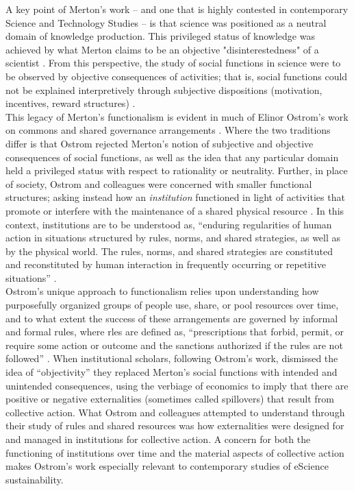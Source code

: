 \documentclass[thesis,tocnosub,noragright,centerchapter,12pt]{uiucecethesis09}
\begin{document}
A key point of
Merton's work -- and one that is highly contested in contemporary
Science and Technology Studies -- is that science was positioned as a
neutral domain of knowledge production. This privileged status of knowledge was achieved by what Merton claims to be an objective "disinterestedness" of a scientist \citeyear{merton1973sociology}. From this perspective, the study of social functions in science were to be observed by objective
consequences of activities; that is,  social functions could not be explained
interpretively through subjective dispositions (motivation, incentives,
reward structures) \citeyearpar[Ch. 13]{merton1973sociology}.\\

This legacy of Merton's functionalism is evident in much of Elinor
Ostrom's work on commons and shared governance arrangements \citeyear{ostrom1990governing}. Where the two traditions differ is that Ostrom
rejected Merton's notion of subjective and objective consequences of
social functions, as well as the idea that any particular
domain held a privileged status with respect
to rationality or neutrality. Further, in place of society, Ostrom and
colleagues were concerned with smaller functional structures; asking
instead how an \emph{institution} functioned in light of activities that
promote or interfere with the maintenance of a shared physical resource  \citep{aligica2009challenging}. In this context,
institutions are to be understood as, ``enduring regularities of human
action in situations structured by rules, norms, and shared strategies,
as well as by the physical world. The rules, norms, and shared
strategies are constituted and reconstituted by human interaction in
frequently occurring or repetitive situations'' \citep[p. 582]{crawford1995grammar}. \\

Ostrom's unique approach to functionalism relies upon
understanding how purposefully organized groups of people use, share, or
pool resources over time, and to what extent the success of these
arrangements are governed by informal and formal rules, where rles are defined as, ``prescriptions that forbid, permit, or require
some action or outcome and the sanctions authorized if the rules are not
followed''  \citep[as quoted in \cite{imperial2005taking}]{crawford1995grammar}.  When institutional scholars, following Ostrom's work, dismissed the idea of ``objectivity''
they replaced Merton's social functions with intended and unintended
consequences, using the verbiage of economics to imply that there are
positive or negative externalities (sometimes called spillovers) that
result from collective action. What Ostrom and colleagues attempted to
understand through their study of rules and shared resources was how
externalities were designed for and managed in institutions for
collective action. A concern for both the functioning of institutions
over time and the material aspects of collective action makes Ostrom's
work especially relevant to contemporary studies of eScience
sustainability.\\
\end{document}
